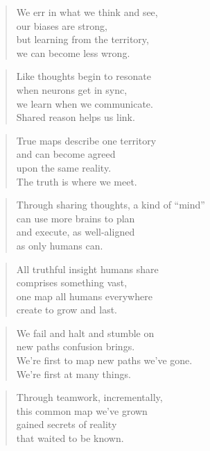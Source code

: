 \documentclass[10pt,a4paper]{article}
\begin{document}
\begin{paracol}{2}
\begin{verse}
We err in what we think and see,\\
our biases are strong,\\
but learning from the territory,\\
we can become less wrong.
\end{verse}

\begin{verse}
Like thoughts begin to resonate\\
when neurons get in sync,\\
we learn when we communicate.\\
Shared reason helps us link.
\end{verse}

\begin{verse}
True maps describe one territory\\
and can become agreed\\
upon the same reality.\\
The truth is where we meet.
\end{verse}

\begin{verse}
Through sharing thoughts, a kind of “mind”\\
can use more brains to plan\\
and execute, as well-aligned\\
as only humans can.
\end{verse}

\begin{verse}
All truthful insight humans share\\
comprises something vast,\\
one map all humans everywhere\\
create to grow and last.
\end{verse}

\begin{verse}
We fail and halt and stumble on\\
new paths confusion brings.\\
We’re first to map new paths we’ve gone.\\
We’re first at many things.
\end{verse}

\begin{verse}
Through teamwork, incrementally,\\
this common map we’ve grown\\
gained secrets of reality\\
that waited to be known.
\end{verse}


\end{paracol}
\end{document}
